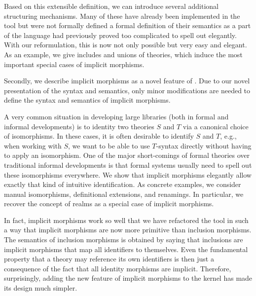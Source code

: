 Based on this extensible definition, we can introduce several additional structuring mechanisms.
Many of these have already been implemented in the \mmt tool but were not formally defined  a formal definition of their semantics as a part of the \mmt language had previously proved too complicated to spell out elegantly.
With our reformulation, this is now not only possible but very easy and elegant.
As an example, we give includes and unions of theories, which induce the most important special cases of implicit morphisms.
\medskip

Secondly, we describe implicit morphisms as a novel feature of \mmt.
Due to our novel presentation of the syntax and semantics, only minor modifications are needed to define the syntax and semantics of implicit morphisms.

A very common situation in developing large libraries (both in formal and informal developments) is to identity two theories $S$ and $T$ via a canonical choice of isomorphisms.
In these cases, it is often desirable to identify $S$ and $T$, e.g., when working with $S$, we want to be able to use $T$-syntax directly without having to apply an isomorphism.
One of the major short-comings of formal theories over traditional informal developments is that formal systems usually need to spell out these isomorphisms everywhere.
We show that implicit morphisms elegantly allow exactly that kind of intuitive identification.
As concrete examples, we consider manual isomorphisms, definitional extensions, and renamings.
In particular, we recover the concept of realms \cite{realms} as a special case of implicit morphisms.

In fact, implicit morphisms work so well that we have refactored the \mmt tool in such a way that implicit morphisms are now more primitive than inclusion morphisms.
The semantics of inclusion morphisms is obtained by saying that inclusions are implicit morphisms that map all identifiers to themselves.
Even the fundamental property that a theory may reference its own identifiers is then just a consequence of the fact that all identity morphisms are implicit.
Therefore, surprisingly, adding the new feature of implicit morphisms to the \mmt kernel has made its design much simpler.
